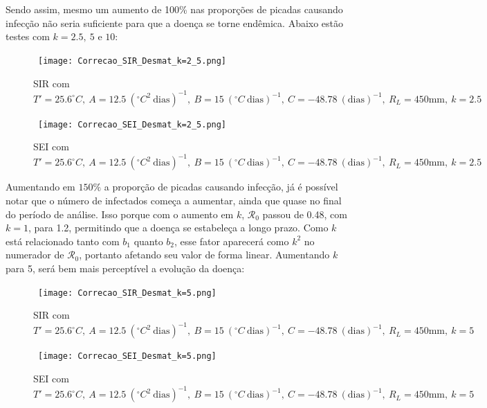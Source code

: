 \\\\
Sendo assim, mesmo um aumento de 100\% nas proporções de picadas causando infecção
não seria suficiente para que a doença se torne endêmica. Abaixo estão testes com $k=2.5, \ 5$ e $10$:
\begin{figure}[!ht]
        \centering
        \hbox{\hspace{2.0em} \texttt{[image: Correcao\_SIR\_Desmat\_k=2\_5.png]}}
        \caption{SIR com $T'=25.6 ^\circ C, \ A=12.5 \ (^\circ C^2 \ \text{dias})^{-1}, \ B=15 \ (^\circ C \ \text{dias})^{-1}, \ C=-48.78 \ (\text{dias})^{-1}, \ R_L=450 \text{mm}, \ k=2.5$}
\end{figure} 
\begin{figure}[!ht]
        \centering
        \hbox{\hspace{1.5em} \texttt{[image: Correcao\_SEI\_Desmat\_k=2\_5.png]}}
        \caption{SEI com $T'=25.6 ^\circ C, \ A=12.5 \ (^\circ C^2 \ \text{dias})^{-1}, \ B=15 \ (^\circ C \ \text{dias})^{-1}, \ C=-48.78 \ (\text{dias})^{-1}, \ R_L=450 \text{mm}, \ k=2.5$}
\end{figure} 
\newpage
Aumentando em $150\%$ a proporção de picadas causando infecção, já é possível notar que o 
número de infectados começa a aumentar, ainda que quase no final do período 
de análise. Isso porque com o aumento em $k$, $\mathcal{R}_0$ passou de 0.48, 
com $k=1$, para 1.2, permitindo que a doença se estabeleça a longo prazo. Como $k$
está relacionado tanto com $b_1$ quanto $b_2$, esse fator aparecerá como $k^2$ no
numerador de $\mathcal{R}_0$, portanto afetando seu valor de forma linear.
Aumentando $k$ para 5, será bem mais perceptível a evolução da doença:
\begin{figure}[!ht]
        \centering
        \hbox{\hspace{3.7em} \texttt{[image: Correcao\_SIR\_Desmat\_k=5.png]}}
        \caption{SIR com $T'=25.6 ^\circ C, \ A=12.5 \ (^\circ C^2 \ \text{dias})^{-1}, \ B=15 \ (^\circ C \ \text{dias})^{-1}, \ C=-48.78 \ (\text{dias})^{-1}, \ R_L=450 \text{mm}, \ k=5$}
\end{figure} 
\begin{figure}[!ht]
        \centering
        \hbox{\hspace{3.2em} \texttt{[image: Correcao\_SEI\_Desmat\_k=5.png]}}
        \caption{SEI com $T'=25.6 ^\circ C, \ A=12.5 \ (^\circ C^2 \ \text{dias})^{-1}, \ B=15 \ (^\circ C \ \text{dias})^{-1}, \ C=-48.78 \ (\text{dias})^{-1}, \ R_L=450 \text{mm}, \ k=5$}
\end{figure} 
